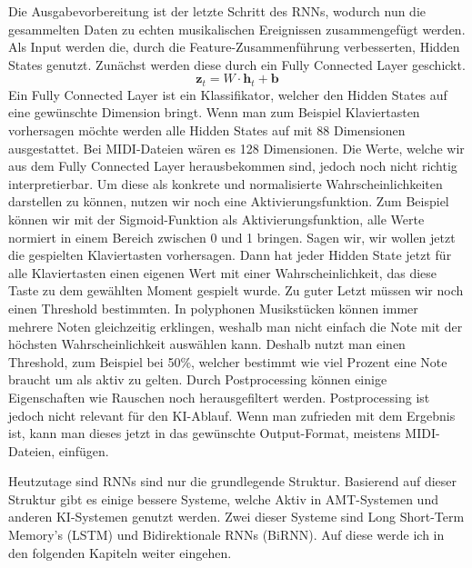 Die Ausgabevorbereitung ist der letzte Schritt des RNNs,
wodurch nun die gesammelten Daten zu echten musikalischen Ereignissen zusammengefügt werden.
Als Input werden die, durch die Feature-Zusammenführung verbesserten, Hidden States genutzt.
Zunächst werden diese durch ein Fully Connected Layer geschickt.
\[
\mathbf{z}_t = W \cdot \mathbf{h}_t + \mathbf{b}
\]
Ein Fully Connected Layer ist ein Klassifikator, welcher den Hidden States auf eine gewünschte Dimension bringt.
Wenn man zum Beispiel Klaviertasten vorhersagen möchte werden alle Hidden States auf mit 88 Dimensionen ausgestattet.
Bei MIDI-Dateien wären es 128 Dimensionen.
Die Werte, welche wir aus dem Fully Connected Layer herausbekommen sind, jedoch noch nicht richtig interpretierbar.
Um diese als konkrete und normalisierte Wahrscheinlichkeiten darstellen zu können,
nutzen wir noch eine Aktivierungsfunktion.
Zum Beispiel können wir mit der Sigmoid-Funktion als Aktivierungsfunktion,
alle Werte normiert in einem Bereich zwischen 0 und 1 bringen.
Sagen wir, wir wollen jetzt die gespielten Klaviertasten vorhersagen.
Dann hat jeder Hidden State jetzt für alle Klaviertasten einen eigenen Wert mit einer Wahrscheinlichkeit,
das diese Taste zu dem gewählten Moment gespielt wurde.
Zu guter Letzt müssen wir noch einen Threshold bestimmten.
In polyphonen Musikstücken können immer mehrere Noten gleichzeitig erklingen,
weshalb man nicht einfach die Note mit der höchsten Wahrscheinlichkeit auswählen kann.
Deshalb nutzt man einen Threshold, zum Beispiel bei 50\%,
welcher bestimmt wie viel Prozent eine Note braucht um als aktiv zu gelten.
Durch Postprocessing können einige Eigenschaften wie Rauschen noch herausgefiltert werden.
Postprocessing ist jedoch nicht relevant für den KI-Ablauf.
Wenn man zufrieden mit dem Ergebnis ist, kann man dieses jetzt in das gewünschte Output-Format,
meistens MIDI-Dateien, einfügen.

Heutzutage sind RNNs sind nur die grundlegende Struktur.
Basierend auf dieser Struktur gibt es einige bessere Systeme,
welche Aktiv in AMT-Systemen und anderen KI-Systemen genutzt werden.
Zwei dieser Systeme sind Long Short-Term Memory's (LSTM) und Bidirektionale RNNs (BiRNN).
Auf diese werde ich in den folgenden Kapiteln weiter eingehen.

